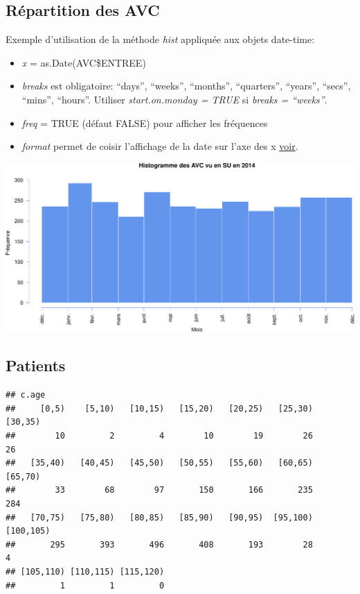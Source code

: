 \documentclass[]{article}
\begin{document}
\subsection{Répartition des AVC}\label{repartition-des-avc}

Exemple d'utilisation de la méthode \emph{hist} appliquée aux objets
date-time:

\begin{itemize}
\itemsep1pt\parskip0pt
\item
  \emph{x} = as.Date(AVC\$ENTREE)
\item
  \emph{breaks} est obligatoire: ``days'', ``weeks'', ``months'',
  ``quarters'', ``years'', ``secs'', ``mins'', ``hours''. Utiliser
  \emph{start.on.monday = TRUE} si \emph{breaks = ``weeks''}.
\item
  \emph{freq} = TRUE (défaut FALSE) pour afficher les fréquences
\item
  \emph{format} permet de coisir l'affichage de la date sur l'axe des x
  \href{https://stat.ethz.ch/R-manual/R-devel/library/base/html/strptime.html}{voir}.
\end{itemize}

\includegraphics{Figs/hist_avc-1.pdf}

\subsection{Patients}\label{patients-3}

\begin{verbatim}
## c.age
##     [0,5)    [5,10)   [10,15)   [15,20)   [20,25)   [25,30)   [30,35) 
##        10         2         4        10        19        26        26 
##   [35,40)   [40,45)   [45,50)   [50,55)   [55,60)   [60,65)   [65,70) 
##        33        68        97       150       166       235       284 
##   [70,75)   [75,80)   [80,85)   [85,90)   [90,95)  [95,100) [100,105) 
##       295       393       496       408       193        28         4 
## [105,110) [110,115) [115,120) 
##         1         1         0
\end{verbatim}
\end{document}
